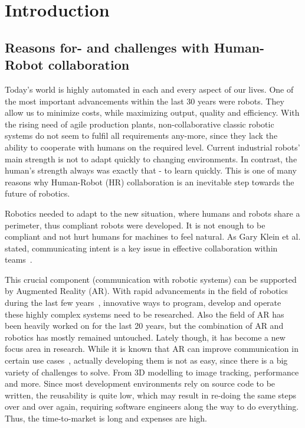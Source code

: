 \chapter{Introduction}\label{Chap:Introduction}

\section{Reasons for- and challenges with Human-Robot collaboration}\label{Section:ProblemDescription}
Today's world is highly automated in each and every aspect of our lives. One of the most important advancements within the last 30 years were robots. They allow us to minimize costs, while maximizing output, quality and efficiency. With the rising need of agile production plants, non-collaborative classic robotic systems do not seem to fulfil all requirements any-more, since they lack the ability to cooperate with humans on the required level. Current industrial robots' main strength is not to adapt quickly to changing environments. In contrast, the human's strength always was exactly that - to learn quickly. This is one of many reasons why Human-Robot (HR) collaboration is an inevitable step towards the future of robotics.

Robotics needed to adapt to the new situation, where humans and robots share a perimeter, thus compliant robots were developed. It is not enough to be compliant and not hurt humans for machines to feel natural. As Gary Klein et al. stated, communicating intent is a key issue in effective collaboration within teams~\cite{klein2005common}. 

This crucial component (communication with robotic systems) can be supported by Augmented Reality (AR). With rapid advancements in the field of robotics during the last few years~\cite{laschi2016soft}, innovative ways to program, develop and operate these highly complex systems need to be researched. Also the field of AR has been heavily worked on for the last 20 years, but the combination of AR and robotics has mostly remained untouched. Lately though, it has become a new focus area in research. While it is known that AR can improve communication in certain use cases~\cite{ARCommunicationBenefits}, actually developing them is not as easy, since there is a big variety of challenges to solve. From 3D modelling to image tracking, performance and more. Since most development environments rely on source code to be written, the reusability is quite low, which may result in re-doing the same steps over and over again, requiring software engineers along the way to do everything. Thus, the time-to-market is long and expenses are high.

